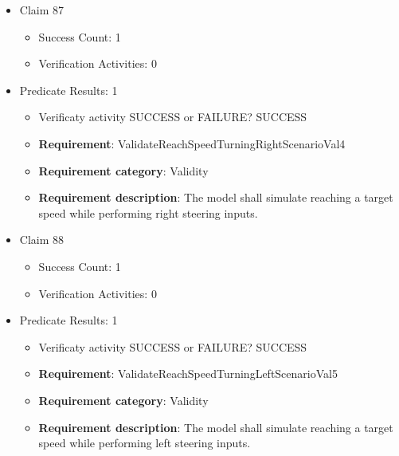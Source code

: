 \documentclass{article}
\begin{document}
\begin{itemize}
\begin{itemize}
					\item \textbf{Requirement}: ValidateReachSpeedScenarioVal3 
					\item \textbf{Requirement category}: Validity
					\item \textbf{Requirement description}: The model shall reproduce vehicle behavior when accelerating to a specified target speed under normal conditions.
					\end{itemize}

  				  \item Claim 87
				\begin{itemize}
			    	\item Success Count: 1 
			    	\item Verification Activities: 0
				\end{itemize}
				
									    
				\item Predicate Results: 1
					\begin{itemize}				
					\item Verificaty activity SUCCESS or FAILURE? SUCCESS
					
					\item \textbf{Requirement}: ValidateReachSpeedTurningRightScenarioVal4 
					\item \textbf{Requirement category}: Validity
					\item \textbf{Requirement description}: The model shall simulate reaching a target speed while performing right steering inputs.
					\end{itemize}

  				  \item Claim 88
				\begin{itemize}
			    	\item Success Count: 1 
			    	\item Verification Activities: 0
				\end{itemize}
				
									    
				\item Predicate Results: 1
					\begin{itemize}				
					\item Verificaty activity SUCCESS or FAILURE? SUCCESS
					
					\item \textbf{Requirement}: ValidateReachSpeedTurningLeftScenarioVal5 
					\item \textbf{Requirement category}: Validity
					\item \textbf{Requirement description}: The model shall simulate reaching a target speed while performing left steering inputs.
					\end{itemize}


\end{itemize}
\end{document}
